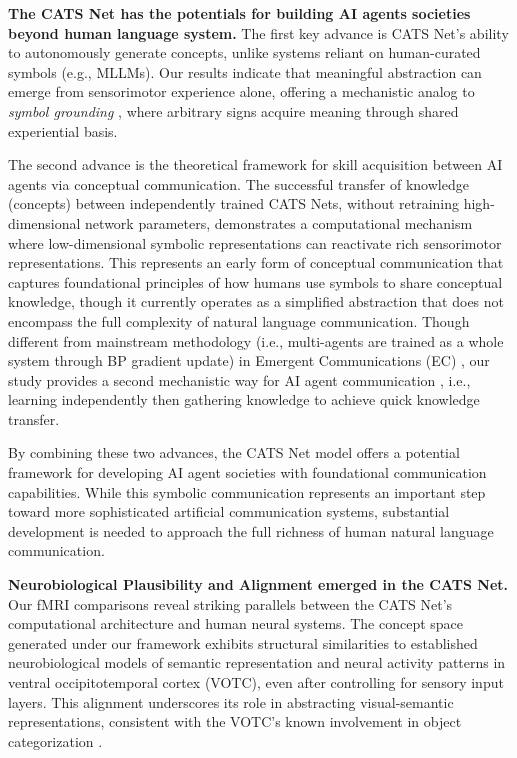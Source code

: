 \documentclass[pdflatex,sn-mathphys-num,lineno]{sn-jnl}%
\begin{document}
\begin{CJK}{UTF8}{gbsn}
\textbf{The CATS Net has the potentials for building AI agents societies beyond human language system.} The first key advance is CATS Net's ability to autonomously generate concepts, unlike systems reliant on human-curated symbols (e.g., MLLMs). Our results indicate that meaningful abstraction can emerge from sensorimotor experience alone, offering a mechanistic analog to \textit{symbol grounding} \cite{harnad_symbol_1990}, where arbitrary signs acquire meaning through shared experiential basis. 

The second advance is the theoretical framework for skill acquisition between AI agents via conceptual communication. The successful transfer of knowledge (concepts) between independently trained CATS Nets, without retraining high-dimensional network parameters, demonstrates a computational mechanism where low-dimensional symbolic representations can reactivate rich sensorimotor representations. This represents an early form of conceptual communication that captures foundational principles of how humans use symbols to share conceptual knowledge, though it currently operates as a simplified abstraction that does not encompass the full complexity of natural language communication. Though different from mainstream methodology (i.e., multi-agents are trained as a whole system through BP gradient update) in Emergent Communications (EC) \cite{foerster_learning_2016,jaques_social_2019,wang_emergence_2024}, our study provides a second mechanistic way for AI agent communication \cite{wieczorek_framework_2024}, i.e., learning independently then gathering knowledge to achieve quick knowledge transfer.

By combining these two advances, the CATS Net model offers a potential framework for developing AI agent societies with foundational communication capabilities. While this symbolic communication represents an important step toward more sophisticated artificial communication systems, substantial development is needed to approach the full richness of human natural language communication. 

\textbf{Neurobiological Plausibility and Alignment emerged in the CATS Net.} Our fMRI comparisons reveal striking parallels between the CATS Net's computational architecture and human neural systems. The concept space generated under our framework exhibits structural similarities to established neurobiological models of semantic representation \cite{binder_toward_2016} and neural activity patterns in ventral occipitotemporal cortex (VOTC), even after controlling for sensory input layers. This alignment underscores its role in abstracting visual-semantic representations, consistent with the VOTC's known involvement in object categorization \cite{ungerleider_what_1994}.


\end{CJK}
\end{document}
